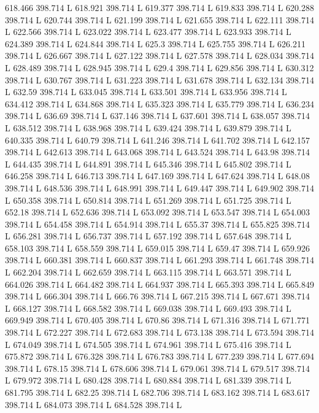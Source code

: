 618.466 398.714 L
618.921 398.714 L
619.377 398.714 L
619.833 398.714 L
620.288 398.714 L
620.744 398.714 L
621.199 398.714 L
621.655 398.714 L
622.111 398.714 L
622.566 398.714 L
623.022 398.714 L
623.477 398.714 L
623.933 398.714 L
624.389 398.714 L
624.844 398.714 L
625.3 398.714 L
625.755 398.714 L
626.211 398.714 L
626.667 398.714 L
627.122 398.714 L
627.578 398.714 L
628.034 398.714 L
628.489 398.714 L
628.945 398.714 L
629.4 398.714 L
629.856 398.714 L
630.312 398.714 L
630.767 398.714 L
631.223 398.714 L
631.678 398.714 L
632.134 398.714 L
632.59 398.714 L
633.045 398.714 L
633.501 398.714 L
633.956 398.714 L
634.412 398.714 L
634.868 398.714 L
635.323 398.714 L
635.779 398.714 L
636.234 398.714 L
636.69 398.714 L
637.146 398.714 L
637.601 398.714 L
638.057 398.714 L
638.512 398.714 L
638.968 398.714 L
639.424 398.714 L
639.879 398.714 L
640.335 398.714 L
640.79 398.714 L
641.246 398.714 L
641.702 398.714 L
642.157 398.714 L
642.613 398.714 L
643.068 398.714 L
643.524 398.714 L
643.98 398.714 L
644.435 398.714 L
644.891 398.714 L
645.346 398.714 L
645.802 398.714 L
646.258 398.714 L
646.713 398.714 L
647.169 398.714 L
647.624 398.714 L
648.08 398.714 L
648.536 398.714 L
648.991 398.714 L
649.447 398.714 L
649.902 398.714 L
650.358 398.714 L
650.814 398.714 L
651.269 398.714 L
651.725 398.714 L
652.18 398.714 L
652.636 398.714 L
653.092 398.714 L
653.547 398.714 L
654.003 398.714 L
654.458 398.714 L
654.914 398.714 L
655.37 398.714 L
655.825 398.714 L
656.281 398.714 L
656.737 398.714 L
657.192 398.714 L
657.648 398.714 L
658.103 398.714 L
658.559 398.714 L
659.015 398.714 L
659.47 398.714 L
659.926 398.714 L
660.381 398.714 L
660.837 398.714 L
661.293 398.714 L
661.748 398.714 L
662.204 398.714 L
662.659 398.714 L
663.115 398.714 L
663.571 398.714 L
664.026 398.714 L
664.482 398.714 L
664.937 398.714 L
665.393 398.714 L
665.849 398.714 L
666.304 398.714 L
666.76 398.714 L
667.215 398.714 L
667.671 398.714 L
668.127 398.714 L
668.582 398.714 L
669.038 398.714 L
669.493 398.714 L
669.949 398.714 L
670.405 398.714 L
670.86 398.714 L
671.316 398.714 L
671.771 398.714 L
672.227 398.714 L
672.683 398.714 L
673.138 398.714 L
673.594 398.714 L
674.049 398.714 L
674.505 398.714 L
674.961 398.714 L
675.416 398.714 L
675.872 398.714 L
676.328 398.714 L
676.783 398.714 L
677.239 398.714 L
677.694 398.714 L
678.15 398.714 L
678.606 398.714 L
679.061 398.714 L
679.517 398.714 L
679.972 398.714 L
680.428 398.714 L
680.884 398.714 L
681.339 398.714 L
681.795 398.714 L
682.25 398.714 L
682.706 398.714 L
683.162 398.714 L
683.617 398.714 L
684.073 398.714 L
684.528 398.714 L
